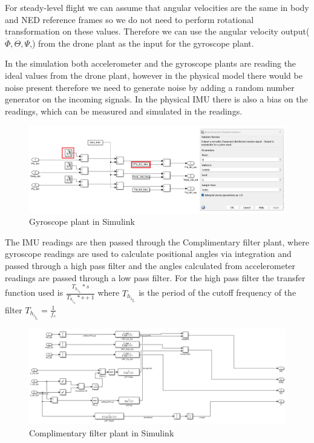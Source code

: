\begin{flushleft}
For steady-level flight we can assume that angular velocities are the same in body and NED reference frames so we do not need to perform rotational transformation on these values. Therefore we can use the angular velocity output($\dot{\Phi}, \dot{\Theta}, \dot{\Psi}$,) from the drone plant as the input for the gyroscope plant. 

In the simulation both accelerometer and the gyroscope plants are reading the ideal values from the drone plant, however in the physical model there would be noise present therefore we need to generate noise by adding a random number generator on the incoming signals. In the physical IMU there is also a bias on the readings, which can be measured and simulated in the readings.

\begin{figure}[H]
    \begin{center}
    \includegraphics[scale = 0.45]{pictures/IMU/gyro_plant_nr_genrator.png}
    \end{center}
    \caption{Gyroscope plant in Simulink}
    \label{fig:my_label}
\end{figure}

The IMU readings are then passed through the Complimentary filter plant, where gyroscope readings are used to calculate positional angles via integration and passed through a high pass filter and the angles calculated from accelerometer readings are passed through a low pass filter. For the high pass filter the transfer function used is $\frac{T_h_i_g_h*s}{T_h_i_g_h*s+1}$ where $T_h_i_g_h$ is the period of the cutoff frequency of the filter $T_h_i_g_h=\frac{1}{f_c}$

\begin{figure}[H]
    \begin{center}
    \includegraphics[scale = 0.55]{pictures/IMU/Complimentary_filter_plant.png}
    \end{center}
    \caption{Complimentary filter plant in Simulink}
    \label{fig:my_label}
\end{figure}


\end{flushleft}

